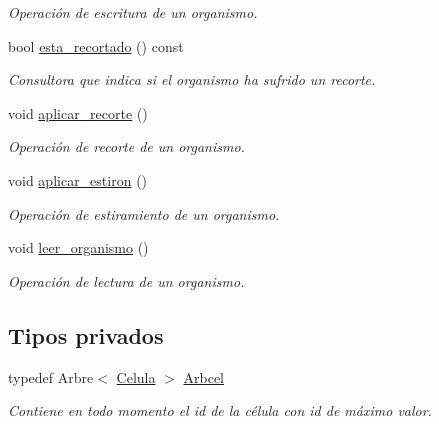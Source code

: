 \begin{DoxyCompactItemize}
\begin{DoxyCompactList}\small\item\em Operación de escritura de un organismo. \end{DoxyCompactList}\item 
bool \hyperlink{class_organismo_a26bac74d7e45a0abe5d3fed49dcd1ced}{esta\-\_\-recortado} () const 
\begin{DoxyCompactList}\small\item\em Consultora que indica si el organismo ha sufrido un recorte. \end{DoxyCompactList}\item 
void \hyperlink{class_organismo_a1747e3ba83922add7df6e0ca6b2c9238}{aplicar\-\_\-recorte} ()
\begin{DoxyCompactList}\small\item\em Operación de recorte de un organismo. \end{DoxyCompactList}\item 
void \hyperlink{class_organismo_a0b7d59aa0b19bf00d876a3050d3e9ab6}{aplicar\-\_\-estiron} ()
\begin{DoxyCompactList}\small\item\em Operación de estiramiento de un organismo. \end{DoxyCompactList}\item 
void \hyperlink{class_organismo_ad94b97b3d085ba9af2df3fb851cb6378}{leer\-\_\-organismo} ()
\begin{DoxyCompactList}\small\item\em Operación de lectura de un organismo. \end{DoxyCompactList}\end{DoxyCompactItemize}
\subsection*{Tipos privados}
\begin{DoxyCompactItemize}
\item 
typedef Arbre$<$ \hyperlink{class_celula}{Celula} $>$ \hyperlink{class_organismo_a6d28459b85f211994ba446ba304fa141}{Arbcel}
\begin{DoxyCompactList}\small\item\em Contiene en todo momento el id de la célula con id de máximo valor. \end{DoxyCompactList}\end{DoxyCompactItemize}
